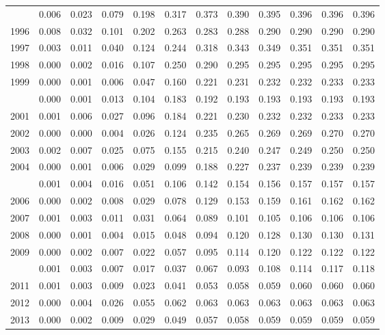 \documentclass[
]{article}
\begin{document}
\begin{longtable}[t]{lrrrrrrrrrrr}
\addlinespace
1995 & 0.006 & 0.023 & 0.079 & 0.198 & 0.317 & 0.373 & 0.390 & 0.395 & 0.396 & 0.396 & 0.396\\
1996 & 0.008 & 0.032 & 0.101 & 0.202 & 0.263 & 0.283 & 0.288 & 0.290 & 0.290 & 0.290 & 0.290\\
1997 & 0.003 & 0.011 & 0.040 & 0.124 & 0.244 & 0.318 & 0.343 & 0.349 & 0.351 & 0.351 & 0.351\\
1998 & 0.000 & 0.002 & 0.016 & 0.107 & 0.250 & 0.290 & 0.295 & 0.295 & 0.295 & 0.295 & 0.295\\
1999 & 0.000 & 0.001 & 0.006 & 0.047 & 0.160 & 0.221 & 0.231 & 0.232 & 0.232 & 0.233 & 0.233\\
\addlinespace
2000 & 0.000 & 0.001 & 0.013 & 0.104 & 0.183 & 0.192 & 0.193 & 0.193 & 0.193 & 0.193 & 0.193\\
2001 & 0.001 & 0.006 & 0.027 & 0.096 & 0.184 & 0.221 & 0.230 & 0.232 & 0.232 & 0.233 & 0.233\\
2002 & 0.000 & 0.000 & 0.004 & 0.026 & 0.124 & 0.235 & 0.265 & 0.269 & 0.269 & 0.270 & 0.270\\
2003 & 0.002 & 0.007 & 0.025 & 0.075 & 0.155 & 0.215 & 0.240 & 0.247 & 0.249 & 0.250 & 0.250\\
2004 & 0.000 & 0.001 & 0.006 & 0.029 & 0.099 & 0.188 & 0.227 & 0.237 & 0.239 & 0.239 & 0.239\\
\addlinespace
2005 & 0.001 & 0.004 & 0.016 & 0.051 & 0.106 & 0.142 & 0.154 & 0.156 & 0.157 & 0.157 & 0.157\\
2006 & 0.000 & 0.002 & 0.008 & 0.029 & 0.078 & 0.129 & 0.153 & 0.159 & 0.161 & 0.162 & 0.162\\
2007 & 0.001 & 0.003 & 0.011 & 0.031 & 0.064 & 0.089 & 0.101 & 0.105 & 0.106 & 0.106 & 0.106\\
2008 & 0.000 & 0.001 & 0.004 & 0.015 & 0.048 & 0.094 & 0.120 & 0.128 & 0.130 & 0.130 & 0.131\\
2009 & 0.000 & 0.002 & 0.007 & 0.022 & 0.057 & 0.095 & 0.114 & 0.120 & 0.122 & 0.122 & 0.122\\
\addlinespace
2010 & 0.001 & 0.003 & 0.007 & 0.017 & 0.037 & 0.067 & 0.093 & 0.108 & 0.114 & 0.117 & 0.118\\
2011 & 0.001 & 0.003 & 0.009 & 0.023 & 0.041 & 0.053 & 0.058 & 0.059 & 0.060 & 0.060 & 0.060\\
2012 & 0.000 & 0.004 & 0.026 & 0.055 & 0.062 & 0.063 & 0.063 & 0.063 & 0.063 & 0.063 & 0.063\\
2013 & 0.000 & 0.002 & 0.009 & 0.029 & 0.049 & 0.057 & 0.058 & 0.059 & 0.059 & 0.059 & 0.059\\

\end{longtable}
\end{document}
